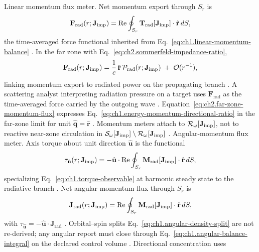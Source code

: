 Linear momentum flux meter. Net momentum export through \(S_r\) is
\begin{equation}
\label{eq:ch2.momentum-flux-functional}
\mathbf{F}_{\mathrm{rad}}(r;\mathbf{J}_{\mathrm{imp}})
=
\Re\oint_{S_r}\mathbf{T}_{\mathrm{rad}}[\mathbf{J}_{\mathrm{imp}}]\cdot\hat{\mathbf{r}}\,dS,
\end{equation}
the time-averaged force functional inherited from
Eq.~\eqref{eq:ch1.linear-momentum-balance} \cite{stratton1941}. In the far zone with
Eq.~\eqref{eq:ch2.sommerfeld-impedance-ratio},
\begin{equation}
\label{eq:ch2.far-zone-momentum-flux}
\mathbf{F}_{\mathrm{rad}}(r;\mathbf{J}_{\mathrm{imp}})
=
\frac{1}{c}\,\hat{\mathbf{r}}\,\mathcal{P}_{\mathrm{rad}}(r;\mathbf{J}_{\mathrm{imp}})
\;+\;\mathcal{O}(r^{-1}),
\end{equation}
linking momentum export to radiated power on the propagating branch
\cite{stratton1941}. A scattering analyst interpreting radiation pressure on a target uses
\(\mathbf{F}_{\mathrm{rad}}\) as the time-averaged force carried by the outgoing wave
\cite{stratton1941}. Equation~\eqref{eq:ch2.far-zone-momentum-flux} expresses
Eq.~\eqref{eq:ch1.energy-momentum-directional-ratio} in the far-zone limit for unit
\(\hat{\mathbf{q}}=\hat{\mathbf{r}}\) \cite{stratton1941}. Momentum meters attach to
\(\mathcal{R}_\omega[\mathbf{J}_{\mathrm{imp}}]\), not to reactive near-zone circulation in
\(\mathcal{S}_\omega[\mathbf{J}_{\mathrm{imp}}]\setminus\mathcal{R}_\omega[\mathbf{J}_{\mathrm{imp}}]\)
\cite{harrington2001}.
Angular-momentum flux meter. Axis torque about unit direction \(\hat{\mathbf{u}}\) is the functional
\begin{equation}
\label{eq:ch2.angular-flux-functional}
\tau_{\hat{\mathbf{u}}}(r;\mathbf{J}_{\mathrm{imp}})
=
-\hat{\mathbf{u}}\cdot\Re\oint_{S_r}
\mathbf{M}_{\mathrm{rad}}[\mathbf{J}_{\mathrm{imp}}]\cdot\hat{\mathbf{r}}\,dS,
\end{equation}
specializing Eq.~\eqref{eq:ch1.torque-observable} at harmonic steady state to the
radiative branch \cite{belinfante1940}. Net angular-momentum flux through
\(S_r\) is
\begin{equation}
\label{eq:ch2.angular-momentum-flux-vector}
\mathbf{J}_{\mathrm{rad}}(r;\mathbf{J}_{\mathrm{imp}})
=
\Re\oint_{S_r}\mathbf{M}_{\mathrm{rad}}[\mathbf{J}_{\mathrm{imp}}]\cdot\hat{\mathbf{r}}\,dS,
\end{equation}
with \(\tau_{\hat{\mathbf{u}}}=-\hat{\mathbf{u}}\cdot\mathbf{J}_{\mathrm{rad}}\)
\cite{stratton1941}. Orbital--spin splits Eq.~\eqref{eq:ch1.angular-density-split} are
not re-derived; any angular report must close through
Eq.~\eqref{eq:ch1.angular-balance-integral} on the declared control volume
\cite{belinfante1940}. Directional concentration uses
